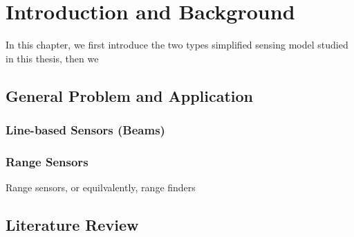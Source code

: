 
\chapter{Introduction and Background}
\thispagestyle{myheadings}
In this chapter, we first introduce the two types simplified sensing model studied in this thesis,
then we 
\section{General Problem and Application}
\subsection{Line-based Sensors (Beams)}
\subsection{Range Sensors}
Range sensors, or equilvalently, range finders

\section{Literature Review}
